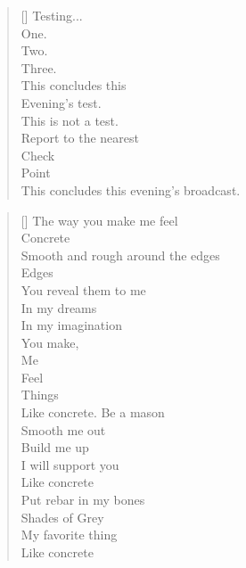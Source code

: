 \documentclass{article}
\begin{document}
\settowidth{\versewidth}{Than Tycho Brahe, or Erra Pater:}
\begin{verse}[\versewidth]
Testing... \\
One. \\
Two. \\
Three. \\
This concludes this \\
Evening's test. \\
This is not a test. \\
Report to the nearest \\
Check \\
Point \\
This concludes this evening's broadcast. \\
\end{verse}
\newpage
{}
\settowidth{\versewidth}{Than Tycho Brahe, or Erra Pater:}
\begin{verse}[\versewidth]
The way you make me feel \\
Concrete \\
Smooth and rough around the edges \\
Edges \\
You reveal them to me \\
In my dreams \\
In my imagination \\
You make, \\
Me \\
Feel \\
Things \\
Like concrete.
Be a mason \\
Smooth me out \\
Build me up \\
I will support you \\
Like concrete \\
Put rebar in my bones \\
Shades of Grey \\
My favorite thing \\
Like concrete \\
\end{verse}
\end{document}
